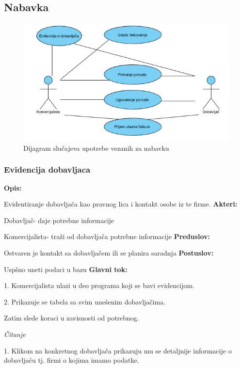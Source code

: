 \subsection{Nabavka}

\begin{figure}[ht]
\centering
\includegraphics[width=120mm]{slike/useCaseNabavka.png}
\caption{Dijagram slučajeva upotrebe vezanih za nabavku}
\end{figure}

\clearpage

\subsubsection{Evidencija dobavljaca}

\textbf{Opis:}

Evidentiranje dobavljača kao pravnog lica i kontakt osobe iz te firme.
\newline
\textbf{Akteri:}

Dobavljač- daje potrebne informacije

Komercijalista- traži od dobavljača potrebne informacije
\newline
\textbf{Preduslov:}

Ostvaren je kontakt sa dobavljačem ili se planira saradnja
\newline
\textbf{Postuslov:}

Uspšno uneti podaci u bazu
\newline
\textbf{Glavni tok:}

1. Komercijalista ulazi u deo programa koji se bavi evidencijom.

2. Prikazuje se tabela sa svim unešenim dobavljačima. 

Zatim slede koraci u zavisnosti od potrebnog.

\textit{Čitanje}

1. Klikom na konkretnog dobavljača prikazuju mu se detaljnije informacije o dobavljaču tj. firmi o kojima imamo podatke.


